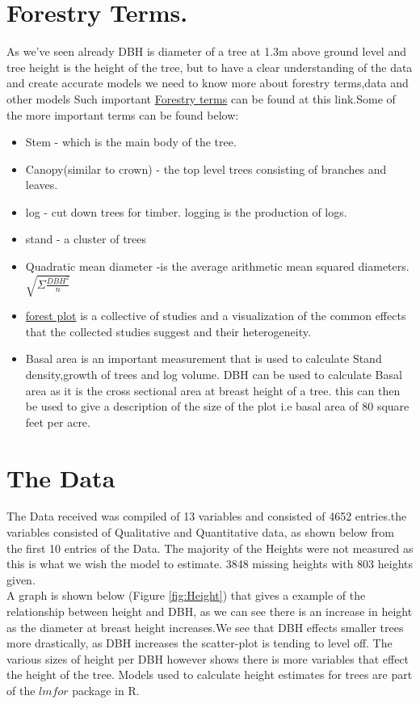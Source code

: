 \documentclass[a4paper,11pt,twoside]{report}
\begin{document}
\section{Forestry Terms.}
As we've seen already DBH is diameter of a tree at 1.3m above ground level and tree height is the height of the tree, but to have a clear understanding of the data and create accurate models we need to know more about forestry terms,data and other models
Such important  \href{http://forestlearning.edu.au/about/forest-terminology-explained.html}{Forestry terms} can be found at this link.Some of the more important terms can be found below:
\begin{itemize}
    \item Stem - which is the main body of the tree.
     \item Canopy(similar to crown) - the top level trees consisting of branches and leaves.
     \item log - cut down trees for timber. logging is the production of logs.
     \item stand - a cluster of trees 
     \item Quadratic mean diameter \cite{10.1093/forestscience/13.4.36} -is the average arithmetic mean squared diameters. 
     $\sqrt{\Sigma\frac{DBH^2}{n}} $
     \item \href{https://www.sciencedirect.com/topics/medicine-and-dentistry/forest-plot}{forest plot} is a collective of studies and a visualization of the common effects that the collected studies suggest and their heterogeneity.
     \item Basal area is an important measurement that is used to calculate Stand density,growth of trees and log volume. DBH can be used to calculate Basal area \cite{elledge2010basal} as it is the cross sectional area at breast height of a tree. this can then be used to give a description of the size of the plot i.e basal area of 80 square feet per acre.
\end{itemize}

\section{The Data}
 The Data received was compiled of 13 variables and consisted of 4652 entries.the variables consisted of Qualitative and Quantitative data, as shown below from the first 10 entries of the Data.
The majority of the Heights were not measured as this is what we wish the model to estimate. 3848 missing heights with 803 heights given.\\
A graph is shown below (Figure \ref{fig:Height}) that gives a example of the relationship between height and DBH, as we can see there is an increase in height as the diameter at breast height increases.We see that DBH effects smaller trees more drastically, as DBH increases the scatter-plot is tending to level off. The various sizes of height per DBH however shows there is more variables that effect the height of the tree.
Models used to calculate height estimates for trees are part of the $lmfor$ package in R.
\end{document}
